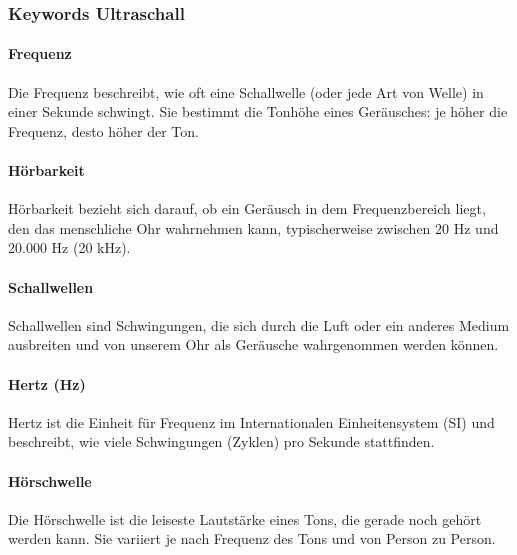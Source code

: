 \documentclass{vorlage-design-main}
\begin{document}
\hypertarget{keywords-ultraschall}{%
\subsubsection{Keywords Ultraschall}\label{keywords-ultraschall}}

\hypertarget{frequenz}{%
\paragraph{Frequenz}\label{frequenz}}

Die Frequenz beschreibt, wie oft eine Schallwelle (oder jede Art von
Welle) in einer Sekunde schwingt. Sie bestimmt die Tonhöhe eines
Geräusches: je höher die Frequenz, desto höher der Ton.

\hypertarget{huxf6rbarkeit}{%
\paragraph{Hörbarkeit}\label{hoerbarkeit}}

Hörbarkeit bezieht sich darauf, ob ein Geräusch in dem Frequenzbereich
liegt, den das menschliche Ohr wahrnehmen kann, typischerweise zwischen
20 Hz und 20.000 Hz (20 kHz).

\hypertarget{schallwellen}{%
\paragraph{Schallwellen}\label{schallwellen}}

Schallwellen sind Schwingungen, die sich durch die Luft oder ein anderes
Medium ausbreiten und von unserem Ohr als Geräusche wahrgenommen werden
können.

\hypertarget{hertz-hz}{%
\paragraph{Hertz (Hz)}\label{hertz-hz}}

Hertz ist die Einheit für Frequenz im Internationalen Einheitensystem
(SI) und beschreibt, wie viele Schwingungen (Zyklen) pro Sekunde
stattfinden.

\hypertarget{huxf6rschwelle}{%
\paragraph{Hörschwelle}\label{hoerschwelle}}

Die Hörschwelle ist die leiseste Lautstärke eines Tons, die gerade noch
gehört werden kann. Sie variiert je nach Frequenz des Tons und von
Person zu Person.
\end{document}
